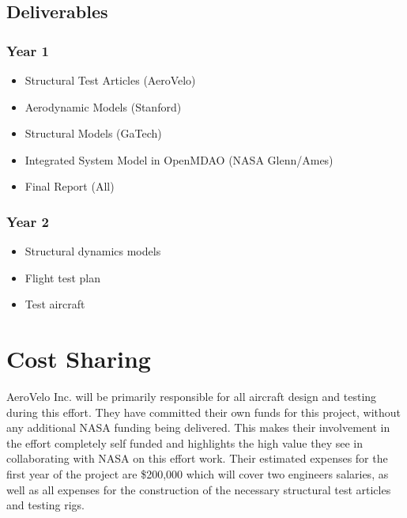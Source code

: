 \documentclass[]{aiaa-tc}
\begin{document}
    \subsection{Deliverables}
        \subsubsection{Year 1}
            \begin{itemize}
                \item Structural Test Articles (AeroVelo)
                \item Aerodynamic Models (Stanford)
                \item Structural Models (GaTech)
                \item Integrated System Model in OpenMDAO (NASA Glenn/Ames)
                \item Final Report (All)
            \end{itemize}
        \subsubsection{Year 2}
            \begin{itemize}
                \item Structural dynamics models 
                \item Flight test plan
                \item Test aircraft
            \end{itemize}


  \section{Cost Sharing}
    AeroVelo Inc. will be primarily responsible for all aircraft design and testing during this effort. 
    They have committed their own funds for this project, without any additional NASA funding being delivered.
    This makes their involvement in the effort completely self funded and highlights the high value they see 
    in collaborating with NASA on this effort work. Their estimated expenses for the first year of the project are \$200,000 
    which will cover two engineers salaries, as well as all expenses for the construction of the necessary 
    structural test articles and testing rigs. 


\end{document}
